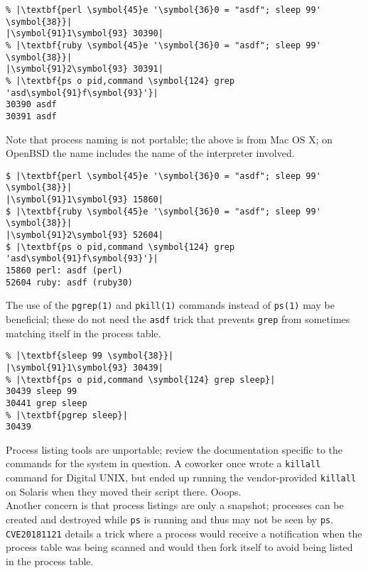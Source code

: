 \documentclass[10pt,a4paper]{article}
\begin{document}
\begin{lstlisting}
% |\textbf{perl \symbol{45}e '\symbol{36}0 = "asdf"; sleep 99' \symbol{38}}|
|\symbol{91}1\symbol{93} 30390|
% |\textbf{ruby \symbol{45}e '\symbol{36}0 = "asdf"; sleep 99' \symbol{38}}|
|\symbol{91}2\symbol{93} 30391|
% |\textbf{ps o pid,command \symbol{124} grep 'asd\symbol{91}f\symbol{93}'}|
30390 asdf
30391 asdf
\end{lstlisting}

Note that process naming is not portable; the above is from Mac OS X; on
OpenBSD the name includes the name of the interpreter involved.

\begin{lstlisting}
$ |\textbf{perl \symbol{45}e '\symbol{36}0 = "asdf"; sleep 99' \symbol{38}}|
|\symbol{91}1\symbol{93} 15860|
$ |\textbf{ruby \symbol{45}e '\symbol{36}0 = "asdf"; sleep 99' \symbol{38}}|
|\symbol{91}2\symbol{93} 52604|
$ |\textbf{ps o pid,command \symbol{124} grep 'asd\symbol{91}f\symbol{93}'}|
15860 perl: asdf (perl)
52604 ruby: asdf (ruby30)
\end{lstlisting}

The use of the \texttt{pgrep(1)} and \texttt{pkill(1)} commands instead
of \texttt{ps(1)} may be beneficial; these do not need the
\texttt{asdf} trick that prevents \texttt{grep}
from sometimes matching itself in the process table.

\begin{lstlisting}
% |\textbf{sleep 99 \symbol{38}}|
|\symbol{91}1\symbol{93} 30439|
% |\textbf{ps o pid,command \symbol{124} grep sleep}|
30439 sleep 99
30441 grep sleep
% |\textbf{pgrep sleep}|
30439
\end{lstlisting}

Process listing tools are unportable; review the documentation specific
to the commands for the system in question. A coworker once wrote a
\texttt{killall} command for Digital UNIX, but ended up running the
vendor-provided \texttt{killall} on Solaris when they moved their script
there. Ooops. \\

Another concern is that process listings are only a snapshot; processes
can be created and destroyed while \texttt{ps} is running and thus may
not be seen by \texttt{ps}. \texttt{CVE20181121}
details a trick where a process would receive a notification when the
process table was being scanned and would then fork itself to avoid
being listed in the process table. \\
\end{document}
